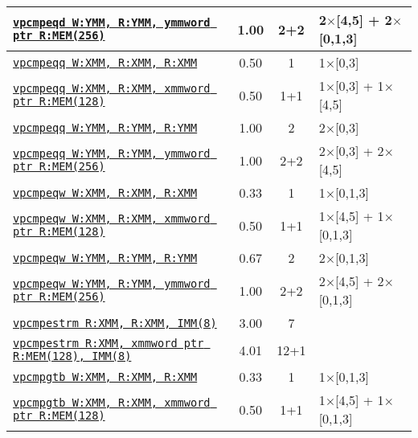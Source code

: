 \documentclass[a4paper,english,fontsize=9]{scrartcl}
\begin{document}
\begin{longtable}{p{}ccL{.25\textwidth}}
  \midrule
  \texttt{\href{https://felixcloutier.com/x86/PCMPEQB:PCMPEQW:PCMPEQD.html}{vpcmpeqd W:YMM, R:YMM, ymmword ptr R:MEM(256)}} & 1.00 & 2+2 & 2\(\times\)[4,5] + 2\(\times\)[0,1,3] \\
  \midrule
  \texttt{\href{https://felixcloutier.com/x86/PCMPEQQ.html}{vpcmpeqq W:XMM, R:XMM, R:XMM}} & 0.50 & 1 & 1\(\times\)[0,3] \\
  \midrule
  \texttt{\href{https://felixcloutier.com/x86/PCMPEQQ.html}{vpcmpeqq W:XMM, R:XMM, xmmword ptr R:MEM(128)}} & 0.50 & 1+1 & 1\(\times\)[0,3] + 1\(\times\)[4,5] \\
  \midrule
  \texttt{\href{https://felixcloutier.com/x86/PCMPEQQ.html}{vpcmpeqq W:YMM, R:YMM, R:YMM}} & 1.00 & 2 & 2\(\times\)[0,3] \\
  \midrule
  \texttt{\href{https://felixcloutier.com/x86/PCMPEQQ.html}{vpcmpeqq W:YMM, R:YMM, ymmword ptr R:MEM(256)}} & 1.00 & 2+2 & 2\(\times\)[0,3] + 2\(\times\)[4,5] \\
  \midrule
  \texttt{\href{https://felixcloutier.com/x86/PCMPEQB:PCMPEQW:PCMPEQD.html}{vpcmpeqw W:XMM, R:XMM, R:XMM}} & 0.33 & 1 & 1\(\times\)[0,1,3] \\
  \midrule
  \texttt{\href{https://felixcloutier.com/x86/PCMPEQB:PCMPEQW:PCMPEQD.html}{vpcmpeqw W:XMM, R:XMM, xmmword ptr R:MEM(128)}} & 0.50 & 1+1 & 1\(\times\)[4,5] + 1\(\times\)[0,1,3] \\
  \midrule
  \texttt{\href{https://felixcloutier.com/x86/PCMPEQB:PCMPEQW:PCMPEQD.html}{vpcmpeqw W:YMM, R:YMM, R:YMM}} & 0.67 & 2 & 2\(\times\)[0,1,3] \\
  \midrule
  \texttt{\href{https://felixcloutier.com/x86/PCMPEQB:PCMPEQW:PCMPEQD.html}{vpcmpeqw W:YMM, R:YMM, ymmword ptr R:MEM(256)}} & 1.00 & 2+2 & 2\(\times\)[4,5] + 2\(\times\)[0,1,3] \\
  \midrule
  \texttt{\href{https://felixcloutier.com/x86/PCMPESTRM.html}{vpcmpestrm R:XMM, R:XMM, IMM(8)}} & 3.00 & 7 &  \\
  \midrule
  \texttt{\href{https://felixcloutier.com/x86/PCMPESTRM.html}{vpcmpestrm R:XMM, xmmword ptr R:MEM(128), IMM(8)}} & 4.01 & 12+1 &  \\
  \midrule
  \texttt{\href{https://felixcloutier.com/x86/PCMPGTB:PCMPGTW:PCMPGTD.html}{vpcmpgtb W:XMM, R:XMM, R:XMM}} & 0.33 & 1 & 1\(\times\)[0,1,3] \\
  \midrule
  \texttt{\href{https://felixcloutier.com/x86/PCMPGTB:PCMPGTW:PCMPGTD.html}{vpcmpgtb W:XMM, R:XMM, xmmword ptr R:MEM(128)}} & 0.50 & 1+1 & 1\(\times\)[4,5] + 1\(\times\)[0,1,3] \\

\end{longtable}
\end{document}
